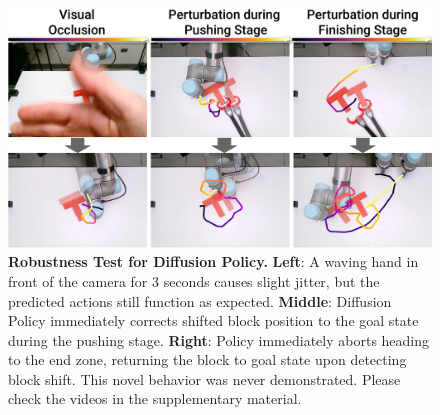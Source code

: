 \documentclass[Afour,sageh,times]{sagej}
\begin{document}
\begin{figure}[t]
\centering
\includegraphics[width=\linewidth]{figure/real_robustness.pdf}

\caption{\textbf{Robustness Test for Diffusion Policy.} 
\label{fig:robustness}
\textbf{Left}: A waving hand in front of the camera for 3 seconds causes slight jitter, but the predicted actions still function as expected. 
\textbf{Middle}: Diffusion Policy immediately corrects shifted block position to the goal state during the pushing stage.
\textbf{Right}: Policy immediately aborts heading to the end zone, returning the block to goal state upon detecting block shift. This novel behavior was never demonstrated.
Please check the videos in the supplementary material. }

\vspace{-4mm}
\end{figure}
\end{document}
